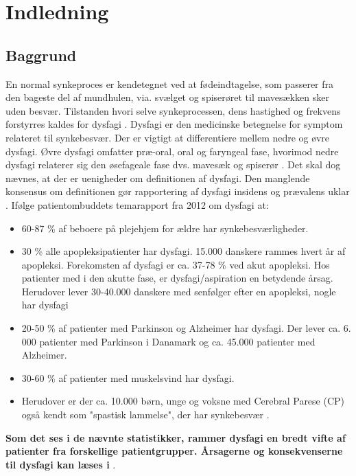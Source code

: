 \chapter{Indledning}

\section{Baggrund}
En normal synkeproces er kendetegnet ved at fødeindtagelse, som passerer fra den bageste del af mundhulen, via. svælget og spiserøret til mavesækken sker uden besvær. Tilstanden hvori selve synkeprocessen, dens hastighed og frekvens forstyrres kaldes for dysfagi \cite{Sundhedsstyrelsen2015NationalDysfagi}. Dysfagi er den medicinske betegnelse for symptom relateret til synkebesvær. Der er vigtigt at differentiere mellem nedre og øvre dysfagi. Øvre dysfagi omfatter præ-oral, oral og faryngeal fase, hvorimod nedre dysfagi relaterer sig den øsefageale fase dvs. mavesæk og spiserør \cite{KjaersgaardPh.d.studerendeDYSFAGIKonsekvenser}. Det skal dog nævnes, at der er uenigheder om definitionen af dysfagi. Den manglende konsensus om definitionen gør rapportering af dysfagi insidens og prævalens uklar \cite{KjaersgaardPh.d.studerendeDYSFAGIKonsekvenser}. Ifølge patientombuddets temarapport fra 2012 om dysfagi at:

\begin{itemize}
\item 60-87 \% af beboere på plejehjem for ældre har synkebesværligheder.
\item 30 \% alle apopleksipatienter har dysfagi. 15.000 danskere rammes hvert år af apopleksi. Forekomsten af dysfagi er ca. 37-78 \% ved akut apopleksi. Hos patienter med i den akutte fase, er dysfagi/aspiration en betydende årsag. Herudover lever 30-40.000 danskere med senfølger efter en apopleksi, nogle har dysfagi
\item 20-50 \% af patienter med Parkinson og Alzheimer har dysfagi. Der lever ca. 6. 000 patienter med Parkinson i Danamark og ca. 45.000 patienter med Alzheimer.  
\item 30-60 \% af patienter med muskelsvind har dysfagi.
\item Herudover er der ca. 10.000 børn, unge og voksne med Cerebral Parese (CP) også kendt som "spastisk lammelse", der har synkebesvær \cite{Bommersholdt2012TemarapportDysfagi}. 
\end{itemize}

\textbf{Som det ses i de nævnte statistikker, rammer dysfagi en bredt vifte af patienter fra forskellige patientgrupper. Årsagerne og konsekvenserne til dysfagi kan læses i} . 

